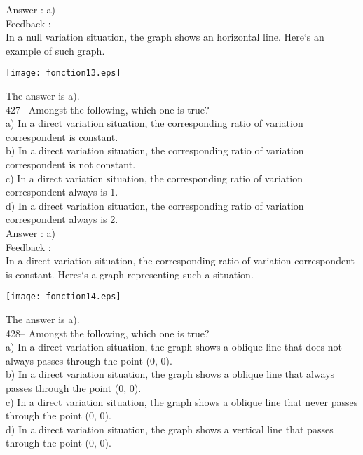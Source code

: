 ﻿\documentclass[letterpaper, 12pt]{article}
\begin{document}
Answer :  a)\\

Feedback : \\
In a null variation situation, the graph shows an horizontal line.
Here`s an example of such graph.\\
    \begin{center}
    \texttt{[image: fonction13.eps]}
    \end{center}

The answer is a).\\

427-- Amongst the following, which one is true?\\
a) In a direct variation situation, the corresponding ratio of variation
correspondent is constant.\\
b) In a direct variation situation, the corresponding ratio of variation
correspondent is not constant.\\
c) In a direct variation situation, the corresponding ratio of variation
correspondent always is 1.\\
d) In a direct variation situation, the corresponding ratio of variation
correspondent always is 2.\\

Answer :  a)\\

Feedback : \\
In a direct variation situation, the corresponding ratio of variation
correspondent is constant.
Heres`s a graph representing such a situation.\\
    \begin{center}
    \texttt{[image: fonction14.eps]}
    \end{center}

The answer is a).\\

428-- Amongst the following, which one is true?\\
a) In a direct variation situation, the graph shows a
oblique line that does not always passes through the point (0, 0).\\
b) In a direct variation situation, the graph shows a
oblique line that always passes through the point (0, 0).\\
c) In a direct variation situation, the graph shows a
oblique line that never passes through the point (0, 0).\\
d) In a direct variation situation, the graph shows a
vertical line that passes through the point (0, 0).\\
\end{document}
